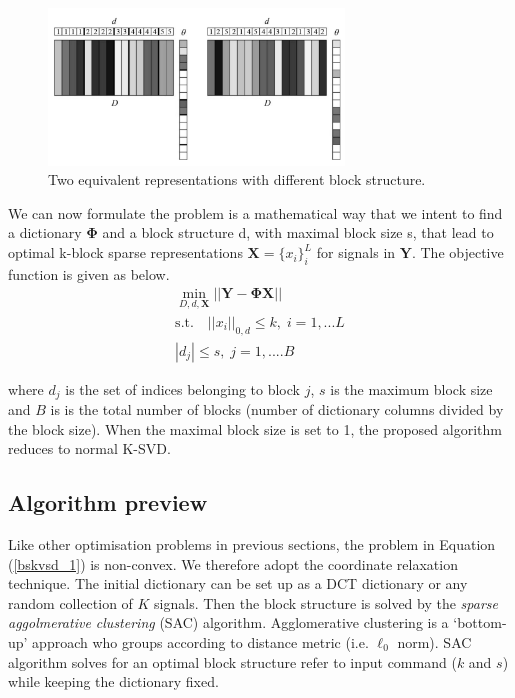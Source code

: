 \begin{figure}[!htbp]
\centering
\includegraphics[width=0.7\textwidth]{images/block_dict_compare.png}
\caption{Two equivalent representations with different block structure.}
\label{block_dict_compare}
\end{figure}

We can now formulate the problem is a mathematical way that we intent to find a dictionary $\mathbf{\Phi}$ and a block structure d, with maximal block size s, that lead to optimal k-block sparse representations $\mathbf{X} = \{x_i\}^L_i $ for signals in $\mathbf{Y}$. The objective function is given as below.\\
\begin{equation}
\begin{aligned} 
    \min_{D,d,\mathbf{X}} ||\mathbf{Y} -\mathbf{\Phi}\mathbf{X}||\\
    \text{s.t.} \quad ||x_i||_{0,d} \leq k, \; i = 1,...L\\
    |d_j| \leq s, \; j = 1,....B
    \label{bskvsd_1}
\end{aligned}
\end{equation}

where $d_j$ is the set of indices belonging to block $j$, $s$ is the maximum block size and $B$ is
is the total number of blocks (number of dictionary columns divided by the block size). When the maximal block size is set to 1, the proposed algorithm reduces to normal K-SVD.\\


\subsection{Algorithm preview}
Like other optimisation problems in previous sections, the problem in Equation (\ref{bskvsd_1}) is non-convex. We therefore adopt the coordinate relaxation technique. The initial dictionary can be set up as a DCT dictionary or any random collection of $K$ signals. Then the block structure is solved by the \textit{sparse aggolmerative clustering} (SAC) algorithm\cite{Johnson1967}. Agglomerative clustering is a `bottom-up' approach who groups according to distance metric (i.e. $\ell_0$ norm). SAC algorithm solves for an optimal block structure refer to input command ($k$ and $s$) while keeping the dictionary fixed.

